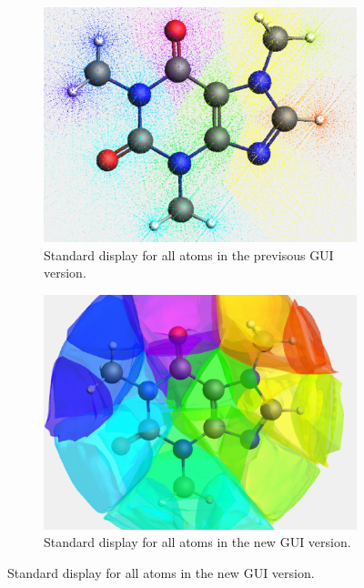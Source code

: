 \begin{figure}[h!]
  \centering
  \begin{subfigure}{0.48\textwidth}
    \centering
    \includegraphics[width=\linewidth]{gui_ss/oldAll2.png}
    \caption{Standard display for all atoms in the previsous \gls{GUI} version.}
  \end{subfigure}
  \begin{subfigure}{0.48\textwidth}
    \centering
    \includegraphics[width=\linewidth]{gui_ss/newAll2.png}
    \caption{Standard display for all atoms in the new \gls{GUI} version.}
  \end{subfigure}


\end{figure}
